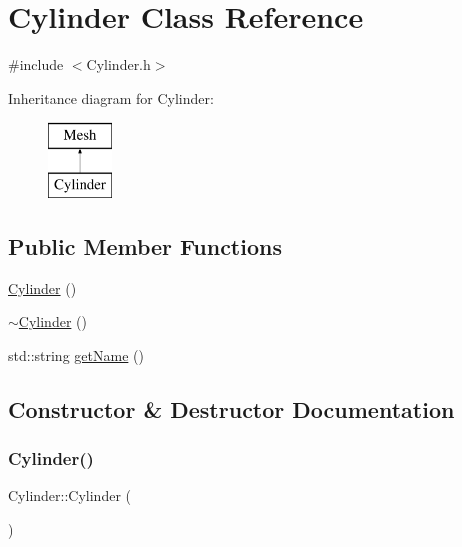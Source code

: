 \hypertarget{class_cylinder}{}\section{Cylinder Class Reference}
\label{class_cylinder}


{\ttfamily \#include $<$Cylinder.\+h$>$}

Inheritance diagram for Cylinder\+:\begin{figure}[H]
\begin{center}
\leavevmode
\includegraphics[height=2.000000cm]{class_cylinder}
\end{center}
\end{figure}
\subsection*{Public Member Functions}
\begin{DoxyCompactItemize}
\item 
\mbox{\hyperlink{class_cylinder_a01dc978cb576f834b9545e43d4dad2a2}{Cylinder}} ()
\item 
\mbox{\hyperlink{class_cylinder_a05ab556f0ae3cd6e99d9d1f3caca80b3}{$\sim$\+Cylinder}} ()
\item 
std\+::string \mbox{\hyperlink{class_cylinder_afdb7f76b3f02471d638c36127395d181}{get\+Name}} ()
\end{DoxyCompactItemize}


\subsection{Constructor \& Destructor Documentation}
\mbox{\label{class_cylinder_a01dc978cb576f834b9545e43d4dad2a2}} 
\subsubsection{\texorpdfstring{Cylinder()}{Cylinder()}}
{\footnotesize\ttfamily Cylinder\+::\+Cylinder (\begin{DoxyParamCaption}{ }\end{DoxyParamCaption})}


